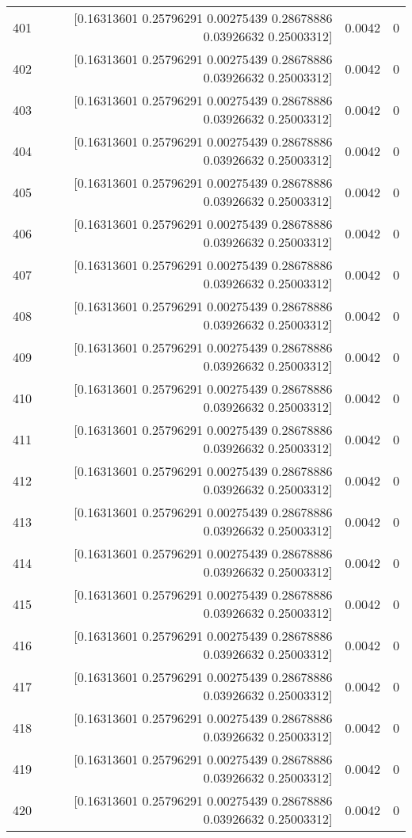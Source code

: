 \begin{longtable}{lrrr}
401 & [0.16313601 0.25796291 0.00275439 0.28678886 0.03926632 0.25003312] & 0.0042 & 0 \\
402 & [0.16313601 0.25796291 0.00275439 0.28678886 0.03926632 0.25003312] & 0.0042 & 0 \\
403 & [0.16313601 0.25796291 0.00275439 0.28678886 0.03926632 0.25003312] & 0.0042 & 0 \\
404 & [0.16313601 0.25796291 0.00275439 0.28678886 0.03926632 0.25003312] & 0.0042 & 0 \\
405 & [0.16313601 0.25796291 0.00275439 0.28678886 0.03926632 0.25003312] & 0.0042 & 0 \\
406 & [0.16313601 0.25796291 0.00275439 0.28678886 0.03926632 0.25003312] & 0.0042 & 0 \\
407 & [0.16313601 0.25796291 0.00275439 0.28678886 0.03926632 0.25003312] & 0.0042 & 0 \\
408 & [0.16313601 0.25796291 0.00275439 0.28678886 0.03926632 0.25003312] & 0.0042 & 0 \\
409 & [0.16313601 0.25796291 0.00275439 0.28678886 0.03926632 0.25003312] & 0.0042 & 0 \\
410 & [0.16313601 0.25796291 0.00275439 0.28678886 0.03926632 0.25003312] & 0.0042 & 0 \\
411 & [0.16313601 0.25796291 0.00275439 0.28678886 0.03926632 0.25003312] & 0.0042 & 0 \\
412 & [0.16313601 0.25796291 0.00275439 0.28678886 0.03926632 0.25003312] & 0.0042 & 0 \\
413 & [0.16313601 0.25796291 0.00275439 0.28678886 0.03926632 0.25003312] & 0.0042 & 0 \\
414 & [0.16313601 0.25796291 0.00275439 0.28678886 0.03926632 0.25003312] & 0.0042 & 0 \\
415 & [0.16313601 0.25796291 0.00275439 0.28678886 0.03926632 0.25003312] & 0.0042 & 0 \\
416 & [0.16313601 0.25796291 0.00275439 0.28678886 0.03926632 0.25003312] & 0.0042 & 0 \\
417 & [0.16313601 0.25796291 0.00275439 0.28678886 0.03926632 0.25003312] & 0.0042 & 0 \\
418 & [0.16313601 0.25796291 0.00275439 0.28678886 0.03926632 0.25003312] & 0.0042 & 0 \\
419 & [0.16313601 0.25796291 0.00275439 0.28678886 0.03926632 0.25003312] & 0.0042 & 0 \\
420 & [0.16313601 0.25796291 0.00275439 0.28678886 0.03926632 0.25003312] & 0.0042 & 0 \\

\end{longtable}
